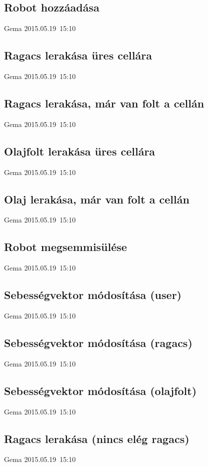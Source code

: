 \subsection{Robot hozzáadása}
\tesztok
{Gema}
{2015.05.19~15:10}

\subsection{Ragacs lerakása üres cellára}
\tesztok
{Gema}
{2015.05.19~15:10}

\subsection{Ragacs lerakása, már van folt a cellán}
\tesztok
{Gema}
{2015.05.19~15:10}

\subsection{Olajfolt lerakása üres cellára}
\tesztok
{Gema}
{2015.05.19~15:10}

\subsection{Olaj lerakása, már van folt a cellán}
\tesztok
{Gema}
{2015.05.19~15:10}

\subsection{Robot megsemmisülése}
\tesztok
{Gema}
{2015.05.19~15:10}

\subsection{Sebességvektor módosítása (user)}
\tesztok
{Gema}
{2015.05.19~15:10}

\subsection{Sebességvektor módosítása (ragacs)}
\tesztok
{Gema}
{2015.05.19~15:10}

\subsection{Sebességvektor módosítása (olajfolt)}
\tesztok
{Gema}
{2015.05.19~15:10}

\subsection{Ragacs lerakása (nincs elég ragacs)}
\tesztok
{Gema}
{2015.05.19~15:10}

